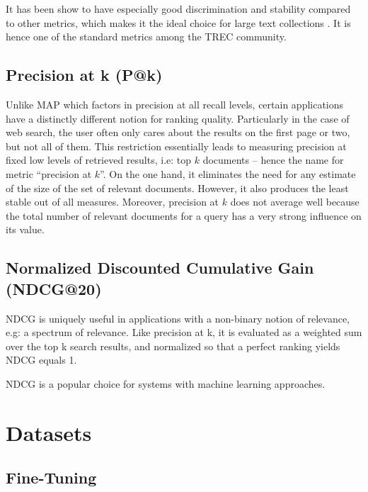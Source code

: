 It has been show to have especially good discrimination and stability compared to other metrics, which makes it the ideal choice for large text collections \cite{manning2010introduction}.
It is hence one of the standard metrics among the TREC community.

\subsection{Precision at k (P@k)}

Unlike MAP which factors in precision at all recall levels, certain applications have a distinctly different notion for ranking quality.
Particularly in the case of web search, the user often only cares about the results on the first page or two, but not all of them.
This restriction essentially leads to measuring precision at fixed low levels of retrieved results, i.e: top $ k $ documents -- hence the name for metric ``precision at $ k $''.
On the one hand, it eliminates the need for any estimate of the size of the set of relevant documents.
However, it also produces the least stable out of all measures.
Moreover, precision at $ k $ does not average well because the total number of relevant documents for a query has a very strong influence on its value. 

\subsection{Normalized Discounted Cumulative Gain (NDCG@20)}

NDCG is uniquely useful in applications with a non-binary notion of relevance, e.g: a spectrum of relevance. 
Like precision at k, it is evaluated as a weighted sum over the top k search results, and normalized so that a perfect ranking yields NDCG equals 1.


NDCG is a popular choice for systems with machine learning approaches.

\section{Datasets}



\subsection{Fine-Tuning}

